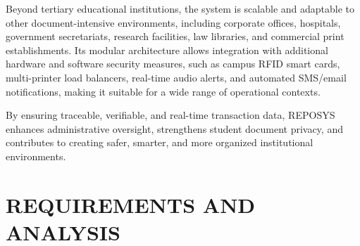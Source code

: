 \documentclass[12pt,a4paper]{report}
\begin{document}
Beyond tertiary educational institutions, the system is scalable and adaptable to other document-intensive environments, including corporate offices, hospitals, government secretariats, research facilities, law libraries, and commercial print establishments. Its modular architecture allows integration with additional hardware and software security measures, such as campus RFID smart cards, multi-printer load balancers, real-time audio alerts, and automated SMS/email notifications, making it suitable for a wide range of operational contexts.

By ensuring traceable, verifiable, and real-time transaction data, REPOSYS enhances administrative oversight, strengthens student document privacy, and contributes to creating safer, smarter, and more organized institutional environments.

\newpage
\chapter{REQUIREMENTS AND ANALYSIS}
\end{document}

